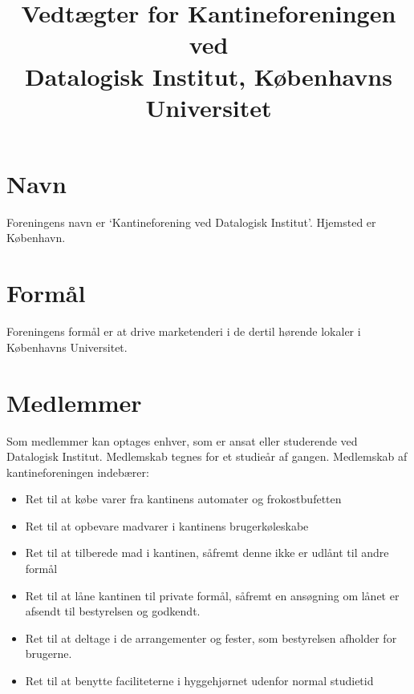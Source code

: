 \documentclass[a4paper, 10pt]{article}
\title{Vedtægter for Kantineforeningen ved \\ Datalogisk Institut,
Københavns Universitet}
\author{}
\date{}
\begin{document}
\maketitle

\section{Navn}

\label{navn} Foreningens navn er `Kantineforening ved Datalogisk
Institut'. Hjemsted er København.

\section{Formål}

\label{formaal} Foreningens formål er at drive marketenderi i de
dertil hørende lokaler i Københavns Universitet.

\section{Medlemmer}

\label{medlemmer} Som medlemmer kan optages enhver, som er ansat eller
studerende ved Datalogisk Institut. Medlemskab tegnes for et studieår
af gangen. Medlemskab af kantineforeningen indebærer:

\medskip

\begin{itemize}

\item Ret til at købe varer fra kantinens automater og frokostbufetten

\item Ret til at opbevare madvarer i kantinens brugerkøleskabe

\item Ret til at tilberede mad i kantinen, såfremt denne ikke er
udlånt til andre formål

\item Ret til at låne kantinen til private formål, såfremt en
ansøgning om lånet er afsendt til bestyrelsen og godkendt.

\item Ret til at deltage i de arrangementer og fester, som bestyrelsen
afholder for brugerne.

\item Ret til at benytte faciliteterne i hyggehjørnet udenfor normal
studietid

\end{itemize}
\end{document}

